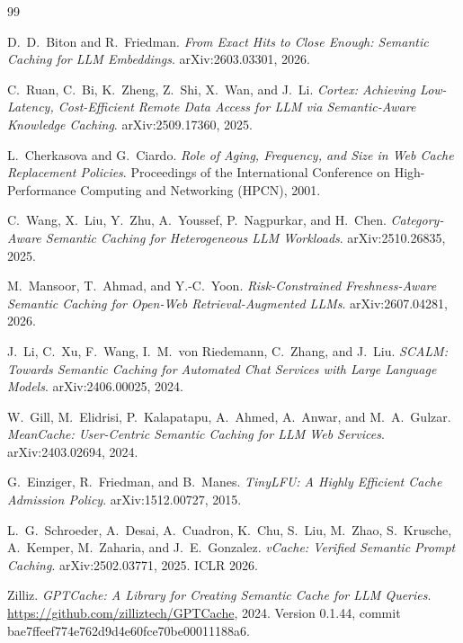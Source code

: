 \documentclass[10pt]{article}
\begin{document}
\footnotesize
\begin{thebibliography}{99}
\setlength{\itemsep}{0pt}
\setlength{\parskip}{0pt}

D.\ D.\ Biton and R.\ Friedman.
\emph{From Exact Hits to Close Enough: Semantic Caching for LLM Embeddings}.
arXiv:2603.03301, 2026.

C.\ Ruan, C.\ Bi, K.\ Zheng, Z.\ Shi, X.\ Wan, and J.\ Li.
\emph{Cortex: Achieving Low-Latency, Cost-Efficient Remote Data Access for LLM via
Semantic-Aware Knowledge Caching}.
arXiv:2509.17360, 2025.

L.\ Cherkasova and G.\ Ciardo.
\emph{Role of Aging, Frequency, and Size in Web Cache Replacement Policies}.
Proceedings of the International Conference on High-Performance Computing and Networking
(HPCN), 2001.

C.\ Wang, X.\ Liu, Y.\ Zhu, A.\ Youssef, P.\ Nagpurkar, and H.\ Chen.
\emph{Category-Aware Semantic Caching for Heterogeneous LLM Workloads}.
arXiv:2510.26835, 2025.

M.\ Mansoor, T.\ Ahmad, and Y.-C.\ Yoon.
\emph{Risk-Constrained Freshness-Aware Semantic Caching for Open-Web
Retrieval-Augmented LLMs}.
arXiv:2607.04281, 2026.

J.\ Li, C.\ Xu, F.\ Wang, I.\ M.\ von Riedemann, C.\ Zhang, and J.\ Liu.
\emph{SCALM: Towards Semantic Caching for Automated Chat Services with Large Language
Models}.
arXiv:2406.00025, 2024.

W.\ Gill, M.\ Elidrisi, P.\ Kalapatapu, A.\ Ahmed, A.\ Anwar, and M.\ A.\ Gulzar.
\emph{MeanCache: User-Centric Semantic Caching for LLM Web Services}.
arXiv:2403.02694, 2024.

G.\ Einziger, R.\ Friedman, and B.\ Manes.
\emph{TinyLFU: A Highly Efficient Cache Admission Policy}.
arXiv:1512.00727, 2015.

L.\ G.\ Schroeder, A.\ Desai, A.\ Cuadron, K.\ Chu, S.\ Liu, M.\ Zhao, S.\ Krusche,
A.\ Kemper, M.\ Zaharia, and J.\ E.\ Gonzalez.
\emph{vCache: Verified Semantic Prompt Caching}.
arXiv:2502.03771, 2025. ICLR 2026.

Zilliz.
\emph{GPTCache: A Library for Creating Semantic Cache for LLM Queries}.
\url{https://github.com/zilliztech/GPTCache}, 2024. Version 0.1.44, commit
bae7ffeef774e762d9d4e60fce70be00011188a6.

\end{thebibliography}
\end{document}
